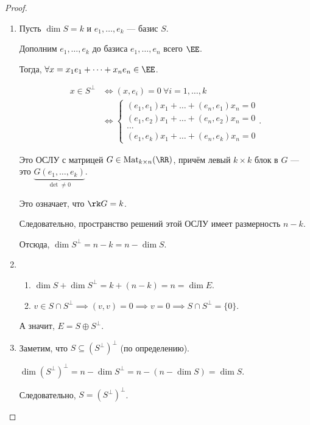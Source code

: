 \begin{proof}~
    \begin{enumerate}
    \item 
        Пусть $\dim S = k$ и $e_1, \dots, e_k$ --- базис $S$.
        
        Дополним $e_1, \dots, e_k$ до базиса $e_1, \dots, e_n$ всего $\EE$.

        Тогда, $\forall x = x_1 e_1 + \dots + x_n e_n \in \EE$.

        \begin{align*}
            x \in S^{\perp} &\iff (x, e_i) = 0 \ \forall i = 1, \dots, k \\
                            &\iff \begin{cases}
                                (e_1, e_1) x_1 + \dots + (e_n, e_1) x_n = 0 \\
                                (e_1, e_2) x_1 + \dots + (e_n, e_2) x_n = 0 \\
                                \dots \\
                                (e_1, e_k) x_1 + \dots + (e_n, e_k) x_n = 0
                            \end{cases}
        .\end{align*}

        Это ОСЛУ с матрицей $G \in \text{Mat}_{k \times n}(\RR)$, причём левый $k \times k$ блок в $G$ --- это $\underbrace{G(e_1, \dots, e_k)}_{\det \neq 0}$.

        Это означает, что $\rk G = k$.

        Следовательно, пространство решений этой ОСЛУ имеет размерность $n - k$.

        Отсюда, $\dim S^{\perp} = n - k = n - \dim S$.

    \item
        \begin{enumerate}
        \item $\dim S + \dim S^{\perp} = k + (n - k) = n = \dim E$.
        \item $v \in S \cap S^{\perp} \implies (v, v) = 0 \implies v = 0 \implies S \cap S^{\perp} = \{0\}$.
        \end{enumerate}

        А значит, $E = S \oplus S^{\perp}$.

    \item
        Заметим, что $S \subseteq (S^{\perp})^{\perp}$ (по определению).

        $\dim (S^{\perp})^{\perp} = n - \dim S^{\perp} = n - (n - \dim S) = \dim S$.

        Следовательно, $S = (S^{\perp})^{\perp}$.
        \qedhere
    \end{enumerate}
\end{proof}


